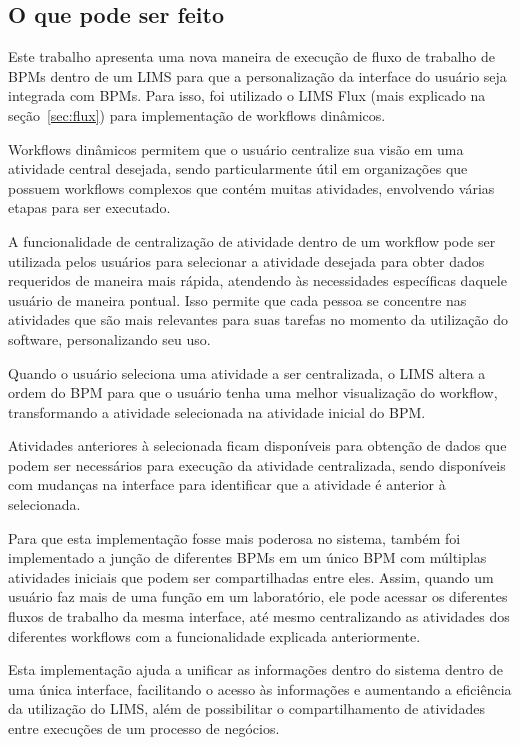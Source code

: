 \subsection{O que pode ser feito}


Este trabalho apresenta uma nova maneira de execução de fluxo de trabalho de BPMs dentro de um LIMS para que a personalização da interface do usuário seja integrada com BPMs. Para isso, foi utilizado o LIMS Flux (mais explicado na seção~\ref{sec:flux}) para implementação de workflows dinâmicos.

Workflows dinâmicos permitem que o usuário centralize sua visão em uma atividade central desejada, sendo particularmente útil em organizações que possuem workflows complexos que contém muitas atividades, envolvendo várias etapas para ser executado.


A funcionalidade de centralização de atividade dentro de um workflow pode ser utilizada pelos usuários para selecionar a atividade desejada para obter dados requeridos de maneira mais rápida, atendendo às necessidades específicas daquele usuário de maneira pontual. Isso permite que cada pessoa se concentre nas atividades que são mais relevantes para suas tarefas no momento da utilização do software, personalizando seu uso.

Quando o usuário seleciona uma atividade a ser centralizada, o LIMS altera a ordem do BPM para que o usuário tenha uma melhor visualização do workflow, transformando a atividade selecionada na atividade inicial do BPM.

Atividades anteriores à selecionada ficam disponíveis para obtenção de dados que podem ser necessários para execução da atividade centralizada, sendo disponíveis com mudanças na interface para identificar que a atividade é anterior à selecionada.


Para que esta implementação fosse mais poderosa no sistema, também foi implementado a junção de diferentes BPMs em um único BPM com múltiplas atividades iniciais que podem ser compartilhadas entre eles. Assim, quando um usuário faz mais de uma função em um laboratório, ele pode acessar os diferentes fluxos de trabalho da mesma interface, até mesmo centralizando as atividades dos diferentes workflows com a funcionalidade explicada anteriormente.

Esta implementação ajuda a unificar as informações dentro do sistema dentro de uma única interface, facilitando o acesso às informações e aumentando a eficiência da utilização do LIMS, além de possibilitar o compartilhamento de atividades entre execuções de um processo de negócios.



